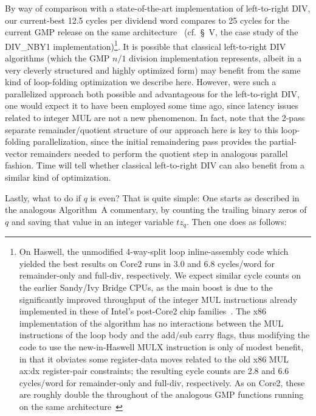 \documentclass{article}
\begin{document}
By way of comparison with a state-of-the-art implementation of left-to-right DIV, our current-best 12.5 cycles per dividend word compares to 25 cycles for the current GMP release on the same architecture~\cite{GMP_div} (cf.~\S~V, the case study of the DIV\_NBY1 implementation)\footnote{On Haswell, the unmodified 4-way-split loop inline-assembly code which yielded the best results on Core2 runs in 3.0 and 6.8 cycles/word for remainder-only and full-div, respectively. We expect similar cycle counts on the earlier Sandy/Ivy Bridge CPUs, as the main boost is due to the significantly improved throughput of the integer MUL instructions already implemented in these of Intel's post-Core2 chip families~\cite{agner}. The x86 implementation of the algorithm has no interactions between the MUL instructions of the loop body and the add/sub carry flags, thus modifying the code to use the new-in-Haswell MULX instruction is only of modest benefit, in that it obviates some register-data moves related to the old x86 MUL ax:dx register-pair constraints; the resulting cycle counts are 2.8 and 6.6 cycles/word for remainder-only and full-div, respectively. As on Core2, these are roughly double the throughout of the analogous GMP functions running on the same architecture~\cite{GMPtiming}}. It is possible that classical left-to-right DIV algorithms (which the GMP $n/1$ division implementation represents, albeit in a very cleverly structured and highly optimized form) may benefit from the same kind of loop-folding optimization we describe here. However, were such a parallelized approach both possible and advantageous for the left-to-right DIV, one would expect it to have been employed some time ago, since latency issues related to integer MUL are not a new phenomenon. In fact, note that the 2-pass separate remainder/quotient structure of our approach here is key to this loop-folding parallelization, since the initial remaindering pass provides the partial-vector remainders needed to perform the quotient step in analogous parallel fashion. Time will tell whether classical left-to-right DIV can also benefit from a similar kind of optimization.

Lastly, what to do if $q$ is even? That is quite simple: One starts as described in the analogous Algorithm~A commentary, by counting the trailing binary zeros of $q$ and saving that value in an integer variable $tz_q$. Then one does as follows:
\vspace{0.1in}
\end{document}
